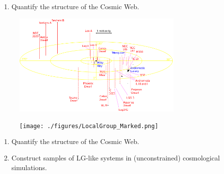 \documentclass[8pt,fleqn]{beamer}
\begin{document}
\begin{frame}
\begin{tcolorbox}[colback=white!5,colframe=black!75!black,title=Motivation]\justifying

	\begin{enumerate}
	\color{black}
	\item Quantify the structure of the Cosmic Web.
	\end{enumerate}

\end{tcolorbox}
\end{frame}
\begin{frame}
\begin{tcolorbox}[colback=white!5,colframe=black!75!black,title=Local Group]\justifying
\begin{figure}[htbp]
	\centering
	\includegraphics[trim = 0mm 0mm 0mm 50mm, clip, width=0.75\textwidth]
	{./figures/LocalGroup.png}
\end{figure}
\end{tcolorbox}
\end{frame}
\begin{frame}
\begin{tcolorbox}[colback=white!5,colframe=black!75!black,title=Local Group]\justifying
\begin{figure}[htbp]
	\centering
	\texttt{[image: ./figures/LocalGroup\_Marked.png]}
\end{figure}
\end{tcolorbox}
\end{frame}
\begin{frame}
\begin{tcolorbox}[colback=white!5,colframe=black!75!black,title=Motivation]\justifying

	\begin{enumerate}
	\color{black}
	\item Quantify the structure of the Cosmic Web.
	\item Construct samples of LG-like systems in (unconstrained) cosmological 
	simulations.
	\end{enumerate}

\end{tcolorbox}
\end{frame}
\end{document}
